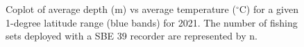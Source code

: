 \documentclass[12pt]{article}\usepackage[]{graphicx}\usepackage[]{color}
\begin{document}
\begin{figure}[htb]

{\centering {} 

}

\caption{Coplot of average depth (m) vs average temperature (\(^\circ\)C) for a given 1-degree latitude range (blue bands) for 2021. The number of fishing sets deployed with a SBE 39 recorder are represented by n.}\label{fig:figure17}
\end{figure}
\clearpage
\end{document}
